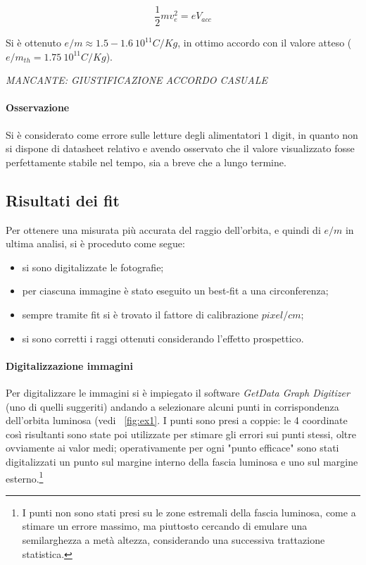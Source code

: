 \documentclass[10pt,a4paper]{article}
\begin{document}
\begin{equation}
\frac{1}{2} m v_e^2 = e V_{acc}
\label{eq:vacc}
\end{equation}

Si è ottenuto  $e/m \approx \unit{1.5-1.6~10^{11}}{C/Kg}$, in ottimo accordo con il valore atteso ($e/m_{th} = \unit{1.75~10^{11}}{C/Kg}$).

\emph{MANCANTE: GIUSTIFICAZIONE ACCORDO CASUALE}

\paragraph{Osservazione} Si è considerato come errore sulle letture degli alimentatori $1$ digit, in quanto non si dispone di datasheet relativo e avendo osservato che il valore visualizzato fosse perfettamente stabile nel tempo, sia a breve che a lungo termine.

\subsection{Risultati dei fit}

Per ottenere una misurata più accurata del raggio dell'orbita, e quindi di $e/m$ in ultima analisi, si è proceduto come segue:
\begin{itemize}
	\item si sono digitalizzate le fotografie;
	\item per ciascuna immagine è stato eseguito un best-fit a una circonferenza;
	\item sempre tramite fit si è trovato il fattore di calibrazione $pixel/cm$;
	\item si sono corretti i raggi ottenuti considerando l'effetto prospettico.
\end{itemize}

\paragraph{Digitalizzazione immagini} Per digitalizzare le immagini si è impiegato il software \emph{GetData Graph Digitizer} (uno di quelli suggeriti) andando a selezionare alcuni punti in corrispondenza dell'orbita luminosa (vedi \figurename{~\ref{fig:ex1}}.
I punti sono presi a coppie: le 4 coordinate così risultanti sono state poi utilizzate per stimare gli errori sui punti stessi, oltre ovviamente ai valor medi; operativamente per ogni "punto efficace" sono stati digitalizzati un punto sul margine interno della fascia luminosa e uno sul margine esterno.\footnote{I punti non sono stati presi su le zone estremali della fascia luminosa, come a stimare un errore massimo, ma piuttosto cercando di emulare una semilarghezza a metà altezza, considerando una successiva trattazione statistica.}
\end{document}
